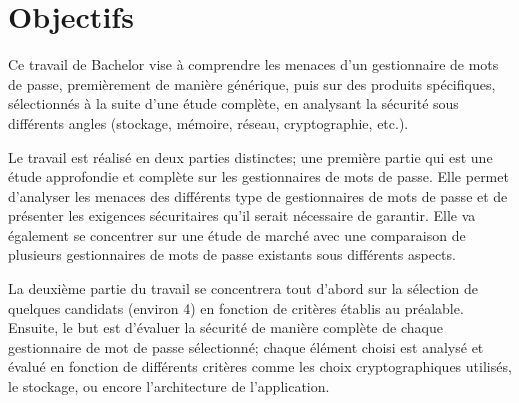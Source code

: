 \section*{Objectifs}
Ce travail de Bachelor vise à comprendre les menaces d'un gestionnaire de mots de passe, premièrement de manière générique, puis sur des produits spécifiques, sélectionnés à la suite d'une étude complète, en analysant la sécurité sous différents angles (stockage, mémoire, réseau, cryptographie, etc.). 

Le travail est réalisé en deux parties distinctes; une première partie qui est une étude approfondie et complète sur les gestionnaires de mots de passe. Elle permet d'analyser les menaces des différents type de gestionnaires de mots de passe et de présenter les exigences sécuritaires qu'il serait nécessaire de garantir. Elle va également se concentrer sur une étude de marché avec une comparaison de plusieurs gestionnaires de mots de passe existants sous différents aspects.

La deuxième partie du travail se concentrera tout d'abord sur la sélection de quelques candidats (environ 4) en fonction de critères établis au préalable. Ensuite, le but est d'évaluer la sécurité de manière complète de chaque gestionnaire de mot de passe sélectionné; chaque élément choisi est analysé et évalué en fonction de différents critères comme les choix cryptographiques utilisés, le stockage, ou encore l'architecture de l'application.


